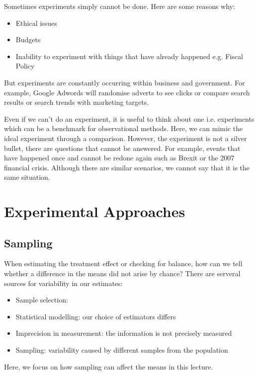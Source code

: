 \documentclass[12pt, letterpaper]{article}
\begin{document}
{\vspace{10pt}
\noindent Sometimes experiments simply cannot be done. Here are some reasons why:
\begin{itemize}
	\item Ethical issues
	\item Budgets
	\item Inability to experiment with things that have already happened e.g. Fiscal Policy
\end{itemize}
But experiments are constantly occurring within business and government. For example, Google Adwords will randomise adverts to see clicks or compare search results or search trends with marketing targets.

\vspace{10pt}
\noindent Even if we can't do an experiment, it is useful to think about one i.e. experiments which can be a benchmark for observational methods. Here, we can mimic the ideal experiment through a comparison. However, the experiment is not a silver bullet, there are questions that cannot be answered. For example, events that have happened once and cannot be redone again such as Brexit or the 2007 financial crisis. Although there are similar scenarios, we cannot say that it is the same situation.

\newpage
\section{Experimental Approaches}

\subsection{Sampling}
When estimating the treatment effect or checking for balance, how can we tell whether a difference in the means did not arise by chance? There are serveral sources for variability in our estimates:
\begin{itemize}
	\item Sample selection: 
	\item Statistical modelling: our choice of estimators differs
	\item Imprecision in measurement: the information is not precisely measured
	\item Sampling: variability caused by different samples from the population
\end{itemize}
Here, we focus on how sampling can affect the means in this lecture.

}
\end{document}
